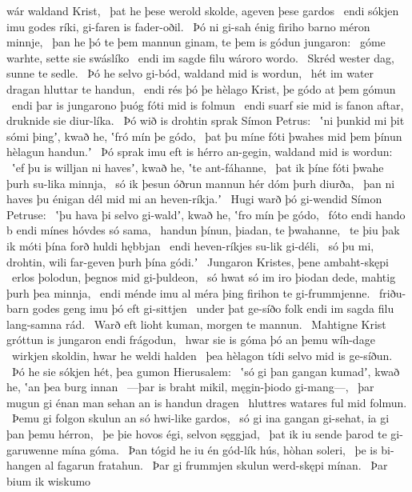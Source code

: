 wár waldand Krist, \hld\ þat he þese werold skolde,
ageven þese gardos \hld\ endi sókjen imu godes ríki,
gi-faren is fader-oðil. \hld\ Þó ni gi-sah énig firiho barno
méron minnje, \hld\ þan he þó te þem mannun ginam,
te þem is gódun jungaron: \hld\ góme warhte,
sette sie swáslíko \hld\ endi im sagde filu
wároro wordo. \hld\ Skréd wester dag,
sunne te sedle. \hld\ Þó he selvo gi-bód,
waldand mid is wordun, \hld\ hét im water dragan
hluttar te handun, \hld\ endi rés þó þe hèlago Krist,
þe gódo at þem gómun \hld\ endi þar is jungarono þuóg
fóti mid is folmun \hld\ endi suarf sie mid is fanon aftar,
druknide sie diur-líka. \hld\ Þó wið is drohtin sprak
Símon Petrus: \hld\ ʽni þunkid mi þit sómi þingʼ, kwað he,
ʽfró mín þe gódo, \hld\ þat þu míne fóti þwahes
mid þem þínun hèlagun handun.ʼ \hld\ Þó sprak imu eft is hérro an-gegin,
waldand mid is wordun: \hld\ ʽef þu is willjan ni havesʼ, kwað he,
ʽte ant-fáhanne, \hld\ þat ik þíne fóti þwahe
þurh su-lika minnja, \hld\ só ik þesun óðrun mannun hér
dóm þurh diurða, \hld\ þan ni haves þu énigan dél mid mi
an heven-ríkja.ʼ \hld\ Hugi warð þó gi-wendid
Símon Petruse: \hld\ ʽþu hava þi selvo gi-waldʼ, kwað he,
ʽfro mín þe gódo, \hld\ fóto endi hando
b endi mínes hóvdes só sama, \hld\ handun þínun,
þiadan, te þwahanne, \hld\ te þiu þak ik móti þína forð
huldi hębbjan \hld\ endi heven-ríkjes
su-lik gi-déli, \hld\ só þu mi, drohtin, wili
far-geven þurh þína gódi.ʼ \hld\ Jungaron Kristes,
þene ambaht-skępi \hld\ erlos þolodun,
þegnos mid gi-þuldeon, \hld\ só hwat só im iro þiodan dede,
mahtig þurh þea minnja, \hld\ endi ménde imu al méra þing
firihon te gi-frummjenne. \hld\ friðu-barn godes
geng imu þó eft gi-sittjen \hld\ under þat ge-síðo folk
endi im sagda filu lang-samna rád. \hld\ Warð eft lioht kuman,
morgen te mannun. \hld\ Mahtigne Krist
gróttun is jungaron endi frágodun, \hld\ hwar sie is góma þó
an þemu wíh-dage \hld\ wirkjen skoldin,
hwar he weldi halden \hld\ þea hèlagon tídi
selvo mid is ge-síðun. \hld\ Þó he sie sókjen hét,
þea gumon Hierusalem: \hld\ ʽsó gi þan gangan kumadʼ, kwað he,
ʽan þea burg innan \hld\ —þar is braht mikil,
męgin-þiodo gi-mang—, \hld\ þar mugun gi énan man sehan
an is handun dragen \hld\ hluttres watares
ful mid folmun. \hld\ Þemu gi folgon skulun
an só hwi-like gardos, \hld\ só gi ina gangan gi-sehat,
ia gi þan þemu hérron, \hld\ þe þie hovos égi,
selvon sęggjad, \hld\ þat ik iu sende þarod
te gi-garuwenne mína góma. \hld\ Þan tógid he iu én gód-lík hús,
hòhan soleri, \hld\ þe is bi-hangen al
fagarun fratahun. \hld\ Þar gi frummjen skulun
werd-skępi mínan. \hld\ Þar bium ik wiskumo
